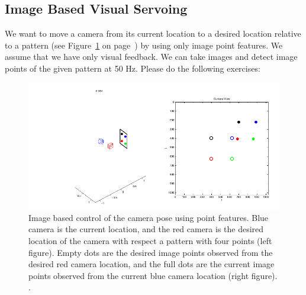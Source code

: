 \documentclass[a4paper,12pt]{article}
\begin{document}
\subsection{Image Based Visual Servoing}
We want to move a camera from its current location to a desired location relative to a pattern 
(see Figure~\ref{fig:ibvs} on page~\pageref{fig:ibvs})
by using only image point features. We assume that we have only visual feedback. We can take images
and detect image points of the given pattern at 50 Hz. Please do the following exercises:
\begin{figure}[tb!]
         \centering
         \includegraphics[width=13cm]{../images/IBVS-intro.png}
         \caption{Image based control of the camera pose using point features. Blue camera is the current location,
and the red camera is the desired location of the camera with respect a pattern with four points (left figure).
Empty dots are the desired image points observed from the desired red camera location, and the full dots
are the current image points observed from the current blue camera location (right figure).
.}
        \label{fig:ibvs}
\end{figure}
\end{document}
